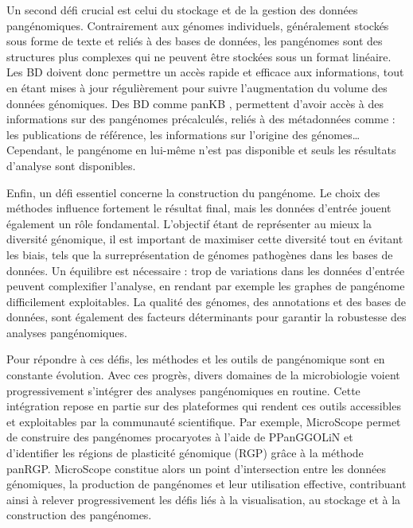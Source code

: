 Un second défi crucial est celui du stockage et de la gestion des données pangénomiques. Contrairement aux génomes individuels, généralement stockés sous forme de texte et reliés à des bases de données, les pangénomes sont des structures plus complexes qui ne peuvent être stockées sous un format linéaire. Les BD doivent donc permettre un accès rapide et efficace aux informations, tout en étant mises à jour régulièrement pour suivre l’augmentation du volume des données génomiques. Des BD comme panKB \cite{sun_pankb_2025}, permettent d'avoir accès à des informations sur des pangénomes précalculés, reliés à des métadonnées comme : les publications de référence, les informations sur l'origine des génomes\dots 
Cependant, le pangénome en lui-même n'est pas disponible et seuls les résultats d'analyse sont disponibles.

Enfin, un défi essentiel concerne la construction du pangénome. Le choix des méthodes influence fortement le résultat final, mais les données d’entrée jouent également un rôle fondamental. L’objectif étant de représenter au mieux la diversité génomique, il est important de maximiser cette diversité tout en évitant les biais, tels que la surreprésentation de génomes pathogènes dans les bases de données. Un équilibre est nécessaire : trop de variations dans les données d’entrée peuvent complexifier l’analyse, en rendant par exemple les graphes de pangénome difficilement exploitables. La qualité des génomes, des annotations et des bases de données, sont également des facteurs déterminants pour garantir la robustesse des analyses pangénomiques.

Pour répondre à ces défis, les méthodes et les outils de pangénomique sont en constante évolution. Avec ces progrès, divers domaines de la microbiologie voient progressivement s'intégrer des analyses pangénomiques en routine. Cette intégration repose en partie sur des plateformes qui rendent ces outils accessibles et exploitables par la communauté scientifique. Par exemple, MicroScope\cite{vallenet_microscope_2020} permet de construire des pangénomes procaryotes à l’aide de PPanGGOLiN \cite{gautreau_ppanggolin_2020} et d’identifier les régions de plasticité génomique (RGP) grâce à la méthode panRGP\cite{bazin_panrgp_2020}. MicroScope constitue alors un point d'intersection entre les données génomiques, la production de pangénomes et leur utilisation effective, contribuant ainsi à relever progressivement les défis liés à la visualisation, au stockage et à la construction des pangénomes.
